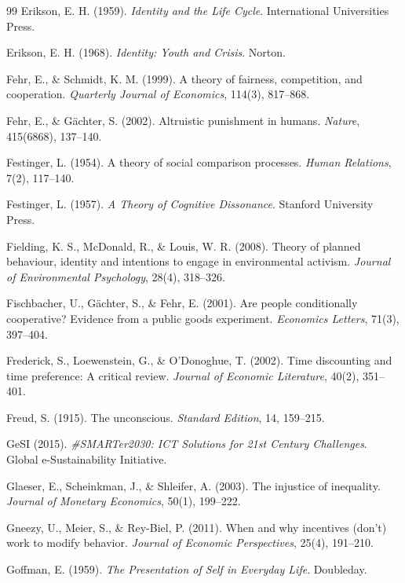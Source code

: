 \begin{thebibliography}{99}
Erikson, E. H. (1959).
\textit{Identity and the Life Cycle}.
International Universities Press.

Erikson, E. H. (1968).
\textit{Identity: Youth and Crisis}.
Norton.

Fehr, E., \& Schmidt, K. M. (1999).
A theory of fairness, competition, and cooperation.
\textit{Quarterly Journal of Economics}, 114(3), 817--868.

Fehr, E., \& Gächter, S. (2002).
Altruistic punishment in humans.
\textit{Nature}, 415(6868), 137--140.

Festinger, L. (1954).
A theory of social comparison processes.
\textit{Human Relations}, 7(2), 117--140.

Festinger, L. (1957).
\textit{A Theory of Cognitive Dissonance}.
Stanford University Press.

Fielding, K. S., McDonald, R., \& Louis, W. R. (2008).
Theory of planned behaviour, identity and intentions to engage in environmental activism.
\textit{Journal of Environmental Psychology}, 28(4), 318--326.

Fischbacher, U., Gächter, S., \& Fehr, E. (2001).
Are people conditionally cooperative? Evidence from a public goods experiment.
\textit{Economics Letters}, 71(3), 397--404.

Frederick, S., Loewenstein, G., \& O'Donoghue, T. (2002).
Time discounting and time preference: A critical review.
\textit{Journal of Economic Literature}, 40(2), 351--401.

Freud, S. (1915).
The unconscious.
\textit{Standard Edition}, 14, 159--215.

GeSI (2015).
\textit{\#SMARTer2030: ICT Solutions for 21st Century Challenges}.
Global e-Sustainability Initiative.

Glaeser, E., Scheinkman, J., \& Shleifer, A. (2003).
The injustice of inequality.
\textit{Journal of Monetary Economics}, 50(1), 199--222.

Gneezy, U., Meier, S., \& Rey-Biel, P. (2011).
When and why incentives (don't) work to modify behavior.
\textit{Journal of Economic Perspectives}, 25(4), 191--210.

Goffman, E. (1959).
\textit{The Presentation of Self in Everyday Life}.
Doubleday.


\end{thebibliography}
